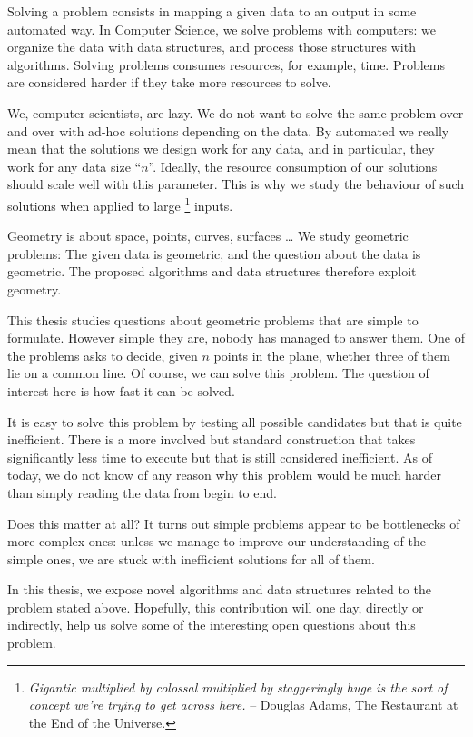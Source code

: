 

Solving a problem consists in mapping a given data to an output in some
automated way.
In Computer Science, we solve problems with computers: we organize the data
with data structures, and process those structures with algorithms.
%
Solving problems consumes resources, for example, time.
Problems are considered harder if they take more resources to solve.

We, computer scientists, are lazy. We do not want to solve the same problem
over and over with ad-hoc solutions depending on the data.
%
By automated we really mean that the solutions we
design work for any data, and in particular, they work for any data size
``\(n\)''.
%
Ideally, the resource consumption of our solutions should scale well with this
parameter.
%
This is why we study the behaviour of such solutions when applied to large%
\footnote{%
\emph{
	Gigantic multiplied by colossal multiplied by staggeringly
	huge is the sort of concept we're trying to get across here.
}-- Douglas Adams, The Restaurant at the End of the Universe.
}
inputs.

Geometry is about space, points, curves, surfaces \dots
We study geometric problems:
%
The given data is geometric, and the question about the data is geometric.
The proposed algorithms and data structures therefore exploit geometry.

This thesis studies questions about geometric problems that are simple to
formulate. However simple they are, nobody
has managed to answer them. One of the problems asks to decide, given \(n\) points in the plane,
whether three of them lie on a common line. Of course, we can solve this
problem. The question of interest here is how fast it can be solved.

It is easy to solve this problem by testing all possible candidates but that is
quite inefficient. There is a
more involved but standard construction that takes significantly less time to
execute but that is still considered inefficient. As of today, we do not know of
any reason why this problem would be much harder than simply
reading the data from begin to end.

Does this matter at all? It turns out simple problems appear to
be bottlenecks of more complex ones: unless we manage to improve our
understanding of the simple ones, we are stuck with inefficient solutions for
all of them.

In this thesis, we expose novel algorithms and data structures related to the
problem stated above.
%
Hopefully, this contribution will one day, directly or indirectly, help us
solve some of the interesting open questions about this problem.
